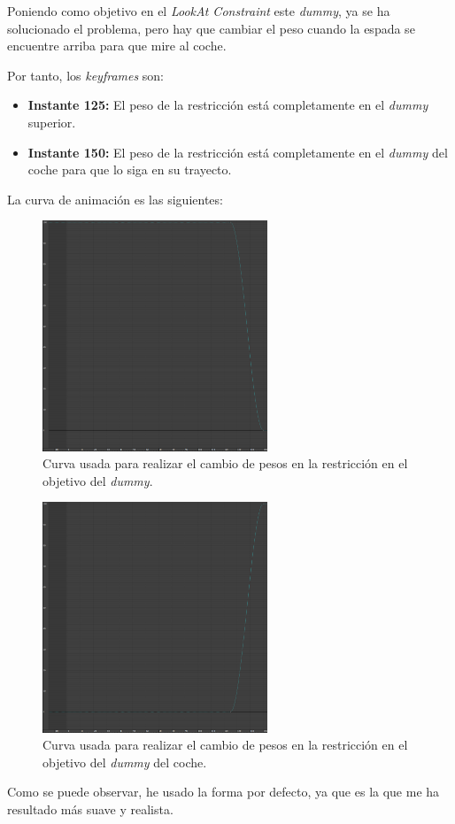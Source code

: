 Poniendo como objetivo en el \textit{LookAt Constraint} este \textit{dummy}, ya se ha solucionado el problema, pero hay que cambiar el peso cuando la espada se encuentre arriba para que mire al coche.

\bigskip

Por tanto, los \textit{keyframes} son:

\begin{itemize}
    \item \textbf{Instante 125: }El peso de la restricción está completamente en el \textit{dummy} superior.
    \item \textbf{Instante 150: }El peso de la restricción está completamente en el \textit{dummy} del coche para que lo siga en su trayecto.
\end{itemize}

\bigskip

La curva de animación es las siguientes:

\begin{figure}[H]
    \centering
   \includegraphics[width=0.6\textwidth]{imagenes/espada/lookat0.png}
   \caption{Curva usada para realizar el cambio de pesos en la restricción en el objetivo del \textit{dummy}.}
\end{figure}

\begin{figure}[H]
    \centering
   \includegraphics[width=0.6\textwidth]{imagenes/espada/lookat1.png}
   \caption{Curva usada para realizar el cambio de pesos en la restricción en el objetivo del \textit{dummy} del coche.}
\end{figure}

Como se puede observar, he usado la forma por defecto, ya que es la que me ha resultado más suave y realista.
